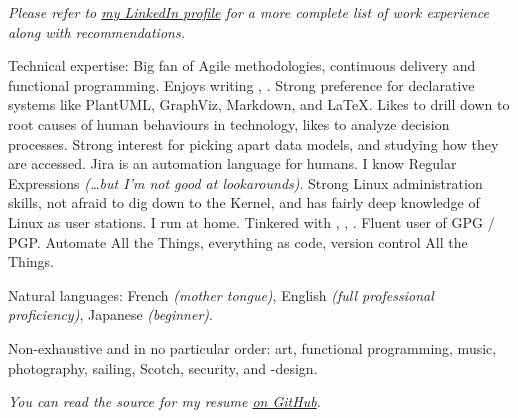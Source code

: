 \documentclass[10pt,letterpaper]{article}
\begin{document}
\begin{center}
  \emph{\small Please refer to \href{https://www.linkedin.com/in/alexis-vanier-94705463/}{my LinkedIn profile} for a more complete list of work experience along with recommendations.}
\end{center}


\spacedhrule{-0.2em}{-0.4em}


\inlineheadsection  %
  {Technical expertise:}
  {Big fan of Agile methodologies, continuous delivery and functional programming. Enjoys writing , . Strong preference for declarative systems like PlantUML, GraphViz, Markdown, and \LaTeX. Likes to drill down to root causes of human behaviours in technology, likes to analyze decision processes. Strong interest for picking apart data models, and studying how they are accessed. Jira is an automation language for humans. I know Regular Expressions \emph{\small{(\ldots but I'm not good at lookarounds)}}. Strong Linux administration skills, not afraid to dig down to the Kernel, and has fairly deep knowledge of Linux as user stations. I run  at home. Tinkered with , , . Fluent user of GPG / PGP. Automate All the Things, everything as code, version control All the Things.}

\vspace{0.5em}
\inlineheadsection
  {Natural languages:}
  {French \emph{(mother tongue)}, English \emph{(full professional proficiency)}, Japanese \emph{(beginner)}.}


\spacedhrule{1.6em}{-0.4em}


\inlineheadsection
  {Non-exhaustive and in no particular order:}
  {art, functional programming, music, photography, sailing, Scotch, security, and -design.}

\vspace{1em}
\begin{center}
  \emph{\small You can read the source for my resume \href{https://github.com/avanier/latex-resume/blob/master/alexis-vanier-resume.tex}{on GitHub}}.
\end{center}
\end{document}

